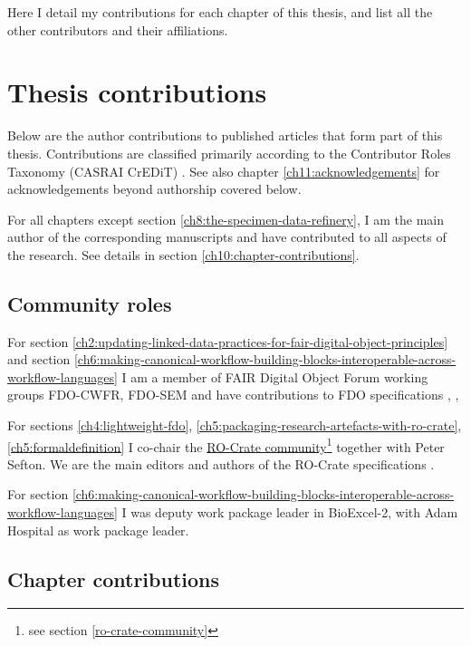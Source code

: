 \label{ch10:contributions} 

Here I detail my contributions for each chapter of this thesis, and
list all the other contributors and their affiliations.

\section{Thesis contributions}\label{ch10:my-contributions}

Below are the author contributions to published articles that form part
of this thesis. Contributions are classified primarily according to the
Contributor Roles Taxonomy (CASRAI CrEDiT) \cite{Brand 2015}. See 
also chapter \vref{ch11:acknowledgements} for acknowledgements beyond authorship covered below.

For all chapters except section \ref{ch8:the-specimen-data-refinery}, I am the main author of the corresponding
manuscripts and have contributed to all aspects of the research. See details in section \vref{ch10:chapter-contributions}.


\subsection{Community roles}

For section \ref{ch2:updating-linked-data-practices-for-fair-digital-object-principles} and section \ref{ch6:making-canonical-workflow-building-blocks-interoperable-across-workflow-languages} I am a member of FAIR Digital Object Forum \cite{FAIRDigitalObjects} working groups FDO-CWFR, FDO-SEM and have contributions to FDO specifications \cite{fdo-RequirementSpec}, \cite{fdo-Overview}, 

For sections \ref{ch4:lightweight-fdo}, \ref{ch5:packaging-research-artefacts-with-ro-crate},  \ref{ch5:formaldefinition} I co-chair the
\href{https://www.researchobject.org/ro-crate/community}{RO-Crate
community}\footnote{see section \vref{ro-crate-community}} together with Peter Sefton. We are the main editors and authors of the RO-Crate specifications \cite{ch5-105,ch5-107,ch5-106}.

For section \ref{ch6:making-canonical-workflow-building-blocks-interoperable-across-workflow-languages} I was deputy work package leader in BioExcel-2, with Adam
Hospital as work package leader.


\subsection{Chapter contributions}\label{ch10:chapter-contributions}

